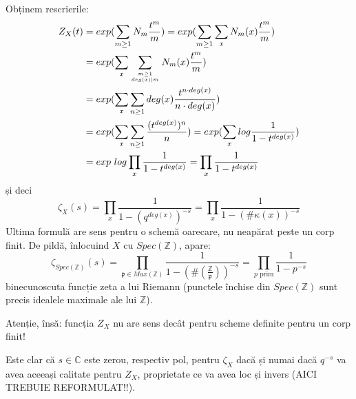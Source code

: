 \documentclass[13pt]{book}
\begin{document}
Obținem rescrierile:
\begin{align*}
Z_X(t)&=exp(\sum_{m\geq 1} N_m \frac{t^m}{m}) = exp(\sum_{m\geq 1} \sum\limits_x N_m(x) \frac{t^m}{m})\\
&=exp(\sum_x \sum_{m \geq 1 \atop deg(x) | m} N_m(x) \frac{t^m}{m})\\
&=exp(\sum_x \sum_{n \geq 1} deg(x) \frac{t^{n\cdot deg(x)}}{n \cdot deg(x)})\\
&=exp(\sum_x \sum_{n\geq 1} \frac{(t^{deg(x)})^n}{n})=exp(\sum_x log \frac{1}{1-t^{deg(x)}})\\
&=exp\ log \prod_x \frac{1}{1-t^{deg(x)}} = \prod_x \frac{1}{1-t^{deg(x)}}
\end{align*}
și deci
$$\zeta_X(s)=\prod_x \frac{1}{1-(q^{deg(x)})^{-s}} = \prod_x \frac{1}{1-(\#\kappa(x))^{-s}}$$
Ultima formulă are sens pentru o schemă oarecare, nu neapărat peste un corp finit. De pildă, înlocuind $X$ cu $Spec(\mathbb{Z})$, apare:
$$\zeta_{Spec(\mathbb{Z})}(s)=\prod_{\mathfrak{p} \in Max(\mathbb{Z})} \frac{1}{1-(\#(\frac{\mathbb{Z}}{\mathfrak{p}}))^{-s}} = \prod_{p\text{ prim}} \frac{1}{1-p^{-s}}$$
binecunoscuta funcție zeta a lui Riemann (punctele închise din $Spec(\mathbb{Z})$ sunt precis idealele maximale ale lui $\mathbb{Z}$).

Atenție, însă: funcția $Z_X$ nu are sens decât pentru scheme definite pentru un corp finit!

Este clar că $s\in\mathbb{C}$ este zerou, respectiv pol, pentru $\zeta_X$ dacă și numai dacă $q^{-s}$ va avea aceeași calitate pentru $Z_X$, proprietate ce va avea loc și invers (AICI TREBUIE REFORMULAT!!).


















\end{document}
